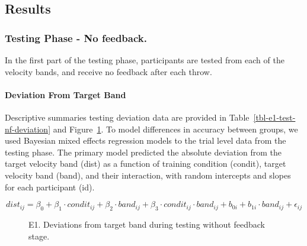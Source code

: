 \documentclass[
  letterpaper,
  DIV=11,
  numbers=noendperiod,
  oneside]{scrartcl}
\let\oldparagraph\paragraph
\renewcommand{\paragraph}[1]{\oldparagraph{#1}\mbox{}}
\begin{document}
\subsection{Results}\label{results}

\subsubsection{Testing Phase - No
feedback.}\label{testing-phase---no-feedback.}

In the first part of the testing phase, participants are tested from
each of the velocity bands, and receive no feedback after each throw.

\paragraph{Deviation From Target Band}\label{deviation-from-target-band}

Descriptive summaries testing deviation data are provided in
Table~\ref{tbl-e1-test-nf-deviation} and Figure~\ref{fig-e1-test-dev}.
To model differences in accuracy between groups, we used Bayesian mixed
effects regression models to the trial level data from the testing
phase. The primary model predicted the absolute deviation from the
target velocity band (dist) as a function of training condition
(condit), target velocity band (band), and their interaction, with
random intercepts and slopes for each participant (id).

\begin{equation}
dist_{ij} = \beta_0 + \beta_1 \cdot condit_{ij} + \beta_2 \cdot band_{ij} + \beta_3 \cdot condit_{ij} \cdot band_{ij} + b_{0i} + b_{1i} \cdot band_{ij} + \epsilon_{ij}
\end{equation}

\begin{figure}


\caption{\label{fig-e1-test-dev}E1. Deviations from target band during
testing without feedback stage.}

\end{figure}%
\end{document}
